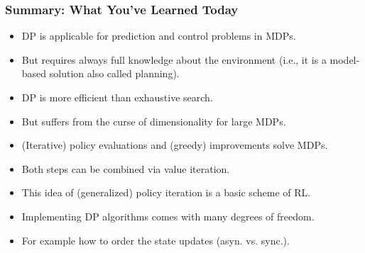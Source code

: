 \begin{frame}
\frametitle{Summary: What You've Learned Today}
\begin{itemize}
	\item DP is applicable for prediction and control problems in MDPs.\pause
	\item But requires always full knowledge about the environment (i.e., it is a model-based solution also called planning).\pause
	\item DP is more efficient than exhaustive search.\pause
	\item But suffers from the curse of dimensionality for large MDPs.\pause
	\item (Iterative) policy evaluations and (greedy) improvements solve MDPs.\pause
	\item Both steps can be combined via value iteration.\pause
	\item This idea of (generalized) policy iteration is a basic scheme of RL.\pause
	\item Implementing DP algorithms comes with many degrees of freedom.
	\item For example how to order the state updates (asyn. vs. sync.).
\end{itemize}
\end{frame}
